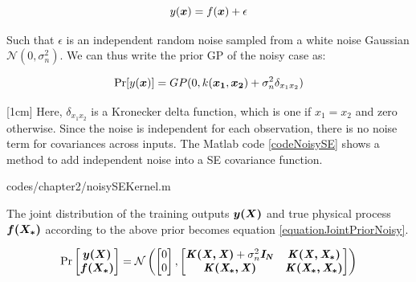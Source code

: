 \begin{equation}\label{eqNoiseEquation}
y(\boldsymbol{x}) = f(\boldsymbol{x}) + \epsilon
\end{equation}

Such that $\epsilon$ is an independent random noise sampled from a white noise Gaussian $\mathcal{N}(0, \sigma_{n}^{2})$. We can thus write the prior GP of the noisy case as:

\begin{equation}\label{equationMeanZeroGPNoisydefinition}
\Pr[y(\boldsymbol{x})] = GP(0 , k(\boldsymbol{x_1}, \boldsymbol{x_2}) + \sigma^{2}_{n}\delta_{x_{1}x_{2}})
\end{equation}

[1cm]
Here, $\delta_{x_{1}x_{2}}$ is a Kronecker delta function, which is one if $x_1 = x_2$ and zero otherwise. Since the noise is independent for each observation, there is no noise term for covariances across inputs. The Matlab code \ref{codeNoisySE} shows a method to add independent noise into a SE covariance function. 

\begin{mdframed}[hidealllines=true,backgroundcolor=lightgray!20]

                    {codes/chapter2/noisySEKernel.m}
\end{mdframed}

The joint distribution of the training outputs $\boldsymbol{y(X)}$ and true physical process $\boldsymbol{f(X_{*})}$ according to the above prior becomes equation \ref{equationJointPriorNoisy}.

\begin{equation}\label{equationJointPriorNoisy}
\Pr\left [ \begin{matrix}
\boldsymbol{y(X)}
\\ \boldsymbol{f(X_{*})}
\end{matrix} \right ]
= 
\mathcal{N}\left (
\left [ \begin{matrix}
0
\\ 0

\end{matrix} \right ] , \left [ \begin{matrix}
\bm{\mathit{K(X, X)}} + \sigma^{2}_{n}\bm{\mathit{I_N}} & \bm{\mathit{K(X, X_{*})}}\\ 
\bm{\mathit{K(X_{*}, X)}} & \bm{\mathit{K(X_{*}, X_{*})}}
\end{matrix} \right ] 
\right )
\end{equation}

